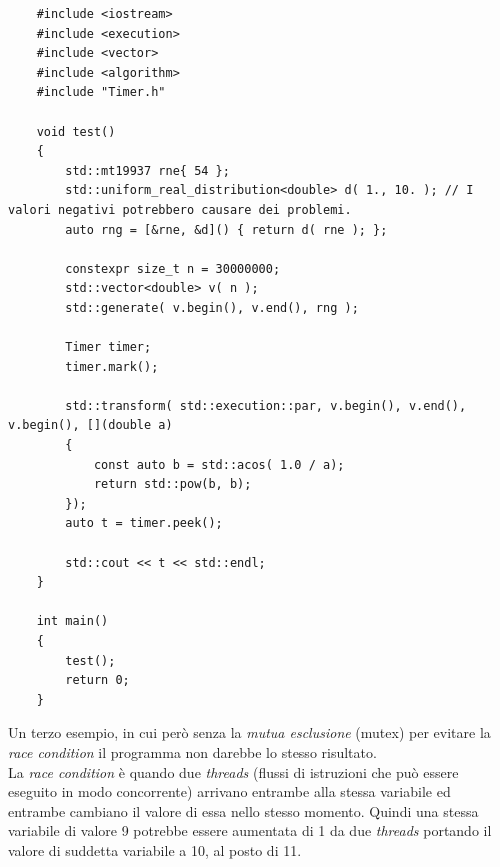\begin{lstlisting}
	#include <iostream>
	#include <execution>
	#include <vector>
	#include <algorithm>
	#include "Timer.h"
	
	void test()
	{
		std::mt19937 rne{ 54 };
		std::uniform_real_distribution<double> d( 1., 10. ); // I valori negativi potrebbero causare dei problemi.
		auto rng = [&rne, &d]() { return d( rne ); };
		
		constexpr size_t n = 30000000;
		std::vector<double> v( n );
		std::generate( v.begin(), v.end(), rng );
		
		Timer timer;
		timer.mark();
		
		std::transform( std::execution::par, v.begin(), v.end(), v.begin(), [](double a)
		{
			const auto b = std::acos( 1.0 / a);
			return std::pow(b, b);
		});
		auto t = timer.peek();
		
		std::cout << t << std::endl;
	}
	
	int main()
	{
		test();
		return 0;
	}
\end{lstlisting}

\textsf{\small Un terzo esempio, in cui però senza la \emph{mutua esclusione} (mutex) per evitare la \emph{race condition} il programma non darebbe lo stesso risultato. } \\

\textsf{\small La \emph{race condition} è quando due \emph{threads} (flussi di istruzioni che può essere eseguito in modo concorrente) arrivano entrambe alla stessa variabile ed entrambe cambiano il valore di essa nello stesso momento. Quindi una stessa variabile di valore 9 potrebbe essere aumentata di 1 da due \emph{threads} portando il valore di suddetta variabile a 10, al posto di 11.} \\

